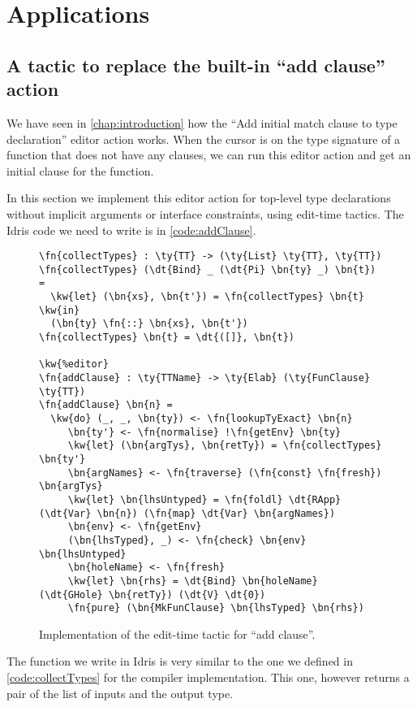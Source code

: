 \chapter{Applications} \label{chap:applications}

\section{A tactic to replace the built-in ``add clause'' action}\label{sec:addClause}

We have seen in \autoref{chap:introduction} how the ``Add initial match clause
to type declaration'' editor action works. When the cursor is on the type
signature of a function that does not have any clauses, we can run this editor
action and get an initial clause for the function.

In this section we implement this editor action for top-level type declarations
without implicit arguments or interface constraints, using edit-time tactics.
The Idris code we need to write is in \autoref{code:addClause}.

\begin{figure}[H]
\caption{Implementation of the edit-time tactic for ``add clause''.}
\label{code:addClause}
\begin{Verbatim}[framesep=2mm, label=\footnotesize{\normalfont{Idris}}, labelposition=topline]
\fn{collectTypes} : \ty{TT} -> (\ty{List} \ty{TT}, \ty{TT})
\fn{collectTypes} (\dt{Bind} _ (\dt{Pi} \bn{ty} _) \bn{t}) =
  \kw{let} (\bn{xs}, \bn{t'}) = \fn{collectTypes} \bn{t} \kw{in}
  (\bn{ty} \fn{::} \bn{xs}, \bn{t'})
\fn{collectTypes} \bn{t} = \dt{([]}, \bn{t})

\kw{%editor}
\fn{addClause} : \ty{TTName} -> \ty{Elab} (\ty{FunClause} \ty{TT})
\fn{addClause} \bn{n} =
  \kw{do} (_, _, \bn{ty}) <- \fn{lookupTyExact} \bn{n}
     \bn{ty'} <- \fn{normalise} !\fn{getEnv} \bn{ty}
     \kw{let} (\bn{argTys}, \bn{retTy}) = \fn{collectTypes} \bn{ty'}
     \bn{argNames} <- \fn{traverse} (\fn{const} \fn{fresh}) \bn{argTys}
     \kw{let} \bn{lhsUntyped} = \fn{foldl} \dt{RApp} (\dt{Var} \bn{n}) (\fn{map} \dt{Var} \bn{argNames})
     \bn{env} <- \fn{getEnv}
     (\bn{lhsTyped}, _) <- \fn{check} \bn{env} \bn{lhsUntyped}
     \bn{holeName} <- \fn{fresh}
     \kw{let} \bn{rhs} = \dt{Bind} \bn{holeName} (\dt{GHole} \bn{retTy}) (\dt{V} \dt{0})
     \fn{pure} (\bn{MkFunClause} \bn{lhsTyped} \bn{rhs})
\end{Verbatim}
\end{figure}

The  function we write in Idris is very similar to the one we
defined in \autoref{code:collectTypes} for the compiler implementation.
This one, however returns a pair of the list of inputs and the output type.


